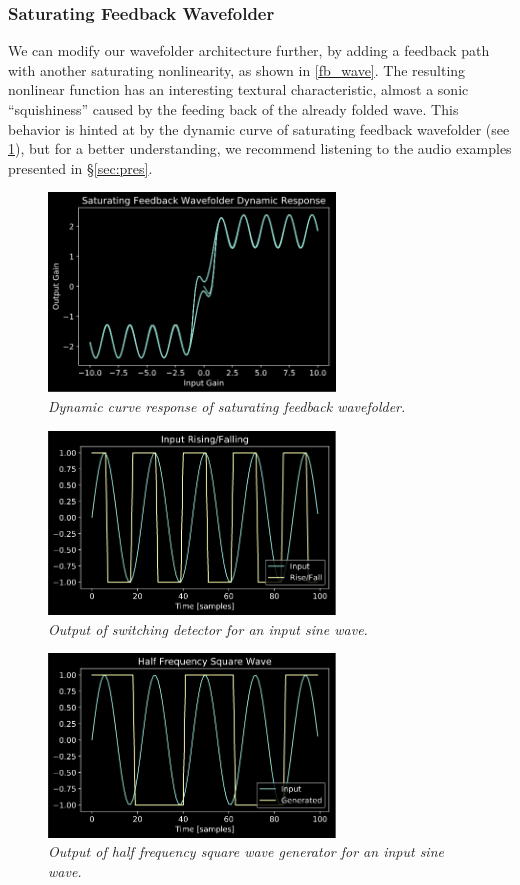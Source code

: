 \documentclass[twoside,a4paper]{article}
\begin{document}
\subsubsection{Saturating Feedback Wavefolder}
%
We can modify our wavefolder architecture further, by adding a
feedback path with another saturating nonlinearity, as shown in
\cref{fb_wave}. The resulting nonlinear function has an interesting
textural characteristic, almost a sonic ``squishiness'' caused by the
feeding back of the already folded wave. This behavior is hinted at by
the dynamic curve of saturating feedback wavefolder (see \cref{fb_dyn}),
but for a better understanding, we recommend listening to the audio
examples presented in \S\ref{sec:pres}.
%
\begin{figure}[!htb]
    \center
    \includegraphics[width=3in]{../Wavefolder/Pics/fb_dyn.png}
    \caption{\label{fb_dyn}{\it Dynamic curve response of saturating feedback wavefolder.}}
\end{figure}
%
\begin{figure}[!htb]
    \center
    \includegraphics[width=3in]{../Subharmonics/Pics/rise_fall.png}
    \caption{\label{square_full}{\it Output of switching detector for an input sine wave.}}
\end{figure}
%
\begin{figure}[!htb]
    \center
    \includegraphics[width=3in]{../Subharmonics/Pics/half_square.png}
    \caption{\label{square_half}{\it Output of half frequency square wave generator for an input sine wave.}}
\end{figure}
\end{document}

